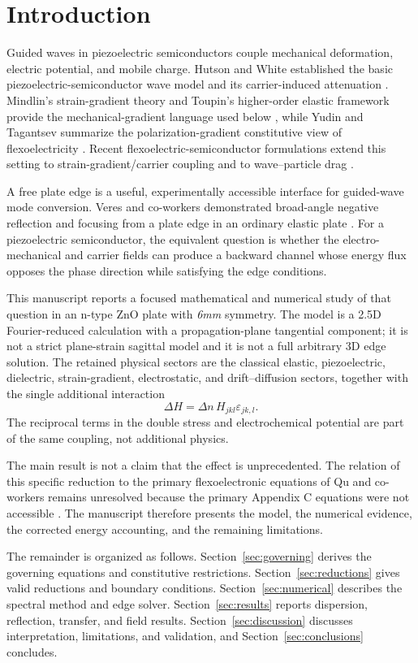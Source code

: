 \section{Introduction}
Guided waves in piezoelectric semiconductors couple mechanical deformation, electric
potential, and mobile charge. Hutson and White established the basic
piezoelectric-semiconductor wave model and its carrier-induced attenuation
\cite{hutson1962}. Mindlin's strain-gradient theory and Toupin's higher-order
elastic framework provide the mechanical-gradient language used below
\cite{mindlin1964,toupin1962}, while Yudin and Tagantsev summarize the
polarization-gradient constitutive view of flexoelectricity \cite{yudin2013}.
Recent flexoelectric-semiconductor formulations extend this setting to
strain-gradient/carrier coupling and to wave--particle drag \cite{qu2025,qu2023}.

A free plate edge is a useful, experimentally accessible interface for guided-wave
mode conversion. Veres and co-workers demonstrated broad-angle negative reflection
and focusing from a plate edge in an ordinary elastic plate \cite{veres2016}.
For a piezoelectric semiconductor, the equivalent question is whether the
electro-mechanical and carrier fields can produce a backward channel whose energy
flux opposes the phase direction while satisfying the edge conditions.

This manuscript reports a focused mathematical and numerical study of that
question in an n-type ZnO plate with \textit{6mm} symmetry. The model is a 2.5D
Fourier-reduced calculation with a propagation-plane tangential component; it is
not a strict plane-strain sagittal model and it is not a full arbitrary 3D edge
solution. The retained physical sectors are the classical elastic, piezoelectric,
dielectric, strain-gradient, electrostatic, and drift--diffusion sectors, together
with the single additional interaction
\[
\Delta H=\Delta n\,H_{jkl}\varepsilon_{jk,l}.
\]
The reciprocal terms in the double stress and electrochemical potential are part
of the same coupling, not additional physics.

The main result is not a claim that the effect is unprecedented. The relation of
this specific reduction to the primary flexoelectronic equations of Qu and
co-workers remains unresolved because the primary Appendix C equations were not
accessible \cite{qu2025}. The manuscript therefore presents the model, the
numerical evidence, the corrected energy accounting, and the remaining limitations.

The remainder is organized as follows. Section~\ref{sec:governing} derives the
governing equations and constitutive restrictions. Section~\ref{sec:reductions}
gives valid reductions and boundary conditions. Section~\ref{sec:numerical}
describes the spectral method and edge solver. Section~\ref{sec:results} reports
dispersion, reflection, transfer, and field results. Section~\ref{sec:discussion}
discusses interpretation, limitations, and validation, and
Section~\ref{sec:conclusions} concludes.
